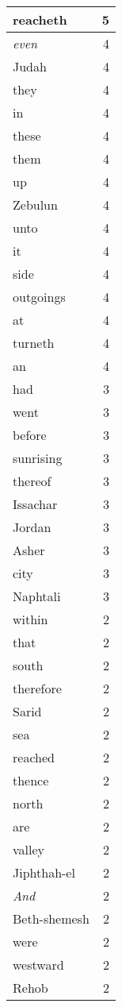 \begin{center}
\begin{longtable}{l|r}
reacheth & 5\\ \hline 
\emph{even} & 4\\ \hline 
Judah & 4\\ \hline 
they & 4\\ \hline 
in & 4\\ \hline 
these & 4\\ \hline 
them & 4\\ \hline 
up & 4\\ \hline 
Zebulun & 4\\ \hline 
unto & 4\\ \hline 
it & 4\\ \hline 
side & 4\\ \hline 
outgoings & 4\\ \hline 
at & 4\\ \hline 
turneth & 4\\ \hline 
an & 4\\ \hline 
had & 3\\ \hline 
went & 3\\ \hline 
before & 3\\ \hline 
sunrising & 3\\ \hline 
thereof & 3\\ \hline 
Issachar & 3\\ \hline 
Jordan & 3\\ \hline 
Asher & 3\\ \hline 
city & 3\\ \hline 
Naphtali & 3\\ \hline 
within & 2\\ \hline 
that & 2\\ \hline 
south & 2\\ \hline 
therefore & 2\\ \hline 
Sarid & 2\\ \hline 
sea & 2\\ \hline 
reached & 2\\ \hline 
thence & 2\\ \hline 
north & 2\\ \hline 
are & 2\\ \hline 
valley & 2\\ \hline 
Jiphthah-el & 2\\ \hline 
\emph{And} & 2\\ \hline 
Beth-shemesh & 2\\ \hline 
were & 2\\ \hline 
westward & 2\\ \hline 
Rehob & 2\\ \hline 

\end{longtable}
\end{center}
